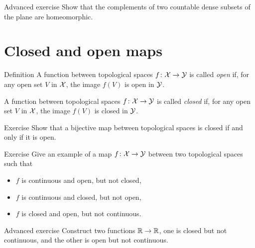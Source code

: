 \begin{thm}{Advanced exercise}
Show that the complements of two countable dense subsets of the plane are homeomorphic.
\end{thm}

\section{Closed and open maps}

\begin{thm}{Definition}\label{def:cont-top}
A function between topological spaces 
$f\colon\mathcal{X}\to\mathcal{Y}$ is called \emph{open} if, for any open set $V$ in $\mathcal{X}$, the image $f(V)$ is open in $\mathcal{Y}$.

A function between topological spaces 
$f\colon\mathcal{X}\to\mathcal{Y}$ is called \emph{closed} if, for any open set $V$ in $\mathcal{X}$, the image $f(V)$ is closed in $\mathcal{Y}$.
\end{thm}

\begin{thm}{Exercise}
Show that a bijective map between topological spaces is closed if and only if it is open.
\end{thm}

\begin{thm}{Exercise}
Give an example of a map $f\colon\mathcal{X}\to\mathcal{Y}$ between two topological spaces such that 
\begin{itemize}
 \item $f$ is continuous and open, but not closed,
 \item $f$ is continuous and closed, but not open,
 \item $f$ is closed and open, but not continuous.
\end{itemize}

\end{thm}

\begin{thm}{Advanced exercise}
Construct two functions $\mathbb{R}\to\mathbb{R}$, one is closed but not continuous, and the other is open but not continuous.
\end{thm}


